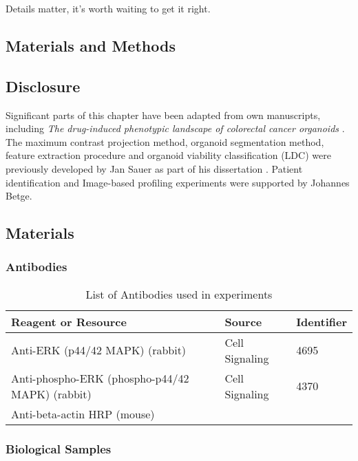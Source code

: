 \begin{savequote}[75mm]
Details matter, it’s worth waiting to get it right.
\end{savequote}

\begin{flushleft}

\chapter{Materials and Methods}

\section{Disclosure}
Significant parts of this chapter have been adapted from own manuscripts, including \textit{The drug-induced phenotypic landscape of colorectal cancer organoids} \cite{Betge2022-kr}. The maximum contrast projection method, organoid segmentation method, feature extraction procedure and organoid viability classification (LDC) were previously developed by Jan Sauer as part of his dissertation \cite{noauthor_undated-ij}. Patient identification and Image-based profiling experiments were supported by Johannes Betge. 

\section{Materials}

\subsection{Antibodies}
\begin{table}[htb]
\caption{List of Antibodies used in experiments}
\label{tab:antibodies} %
\begin{tabularx}{\textwidth}{Xll}
\toprule
\textbf{Reagent or Resource} & \textbf{Source} & \textbf{Identifier} \\
\midrule
Anti-ERK (p44/42 MAPK) (rabbit) & Cell Signaling & 4695 \\
Anti-phospho-ERK (phospho-p44/42 MAPK) (rabbit) & Cell Signaling & 4370 \\
Anti-beta-actin HRP (mouse) &  &  \\
\bottomrule
\end{tabularx}
\end{table}


\subsection{Biological Samples}



\end{flushleft}
